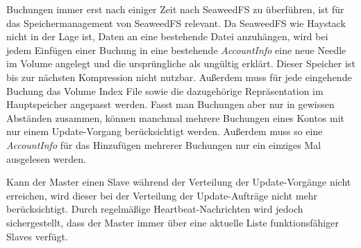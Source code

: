 \documentclass[12pt,oneside,a4paper,parskip]{scrbook}
\begin{document}
Buchungen immer erst nach einiger Zeit nach SeaweedFS zu überführen, ist für das Speichermanagement von SeaweedFS relevant. Da SeaweedFS wie Haystack nicht in der Lage ist, Daten an eine bestehende Datei anzuhängen, wird bei jedem Einfügen einer Buchung in eine bestehende \textit{AccountInfo} eine neue Needle im Volume angelegt und die ursprüngliche als ungültig erklärt. Dieser Speicher ist bis zur nächsten Kompression nicht nutzbar. Außerdem muss für jede eingehende Buchung das Volume Index File sowie die dazugehörige Repräsentation im Hauptspeicher angepasst werden. Fasst man Buchungen aber nur in gewissen Abständen zusammen, können manchmal mehrere Buchungen eines Kontos mit nur einem Update-Vorgang berücksichtigt werden. Außerdem muss so eine \textit{AccountInfo} für das Hinzufügen mehrerer Buchungen nur ein einziges Mal ausgelesen werden.

Kann der Master einen Slave während der Verteilung der Update-Vorgänge nicht erreichen, wird dieser bei der Verteilung der Update-Aufträge nicht mehr berücksichtigt. Durch regelmäßige Heartbeat-Nachrichten wird jedoch sichergestellt, dass der Master immer über eine aktuelle Liste funktionsfähiger Slaves verfügt. 
\end{document}

